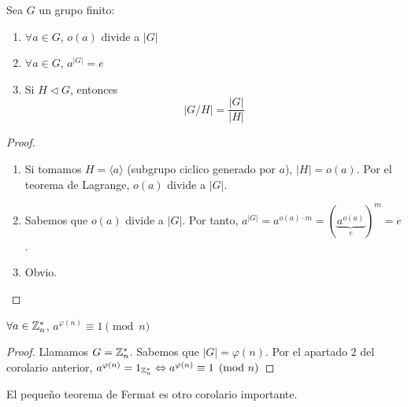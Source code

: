 \begin{corollary}
	Sea \(G \) un grupo finito:
	\begin{enumerate}
		\item \(\forall a \in G \), \(o(a) \) divide a \(|G| \)
		\item \(\forall a \in G \), \(a^{|G|} = e \)
		\item Si \(H \triangleleft G \), entonces
		      \[
			      |G / H| = \frac{|G|}{|H|}
		      \]
	\end{enumerate}
\end{corollary}
\begin{proof}
	\begin{enumerate}
		\item Si tomamos \(H = \langle a \rangle \) (subgrupo ciclico generado por \(a \)), \(|H|= o (a)\). Por el teorema de Lagrange, \(o(a)\) divide a \(|G| \).
		\item Sabemos que \(o(a)\) divide a \( |G| \). Por tanto, \(a^{|G|} = a^{o(a) \cdot m} = (\underbrace{a^{o(a)} }_e)^{m} = e   \).
		\item Obvio.
	\end{enumerate}
\end{proof}
\begin{corollary}
	\(\forall a \in \mathbb{Z}^{*}_n \), \(a^{\varphi (n)} \equiv 1 \pmod n \)
\end{corollary}
\begin{proof}
	Llamamos \(G = \mathbb{Z}^{*}_n \). Sabemos que \(|G| = \varphi (n )\). Por el apartado 2 del corolario anterior, \(a^{\varphi(n)} = 1_{\mathbb{Z}^{*}_n } \Leftrightarrow a^{\varphi(n)} \equiv 1 \pmod n   \)
\end{proof}
\begin{remark}
	El pequeño teorema de Fermat es otro corolario importante.
\end{remark}

